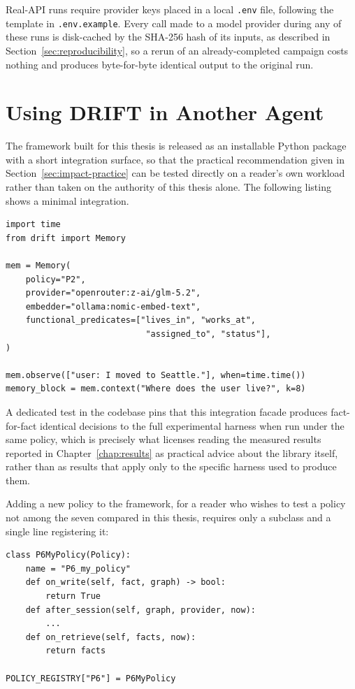 Real-API runs require provider keys placed in a local \texttt{.env} file, following the template in \texttt{.env.example}. Every call made to a model provider during any of these runs is disk-cached by the SHA-256 hash of its inputs, as described in Section~\ref{sec:reproducibility}, so a rerun of an already-completed campaign costs nothing and produces byte-for-byte identical output to the original run.

\section{Using DRIFT in Another Agent}
\label{sec:appendix-integration}

The framework built for this thesis is released as an installable Python package with a short integration surface, so that the practical recommendation given in Section~\ref{sec:impact-practice} can be tested directly on a reader's own workload rather than taken on the authority of this thesis alone. The following listing shows a minimal integration.

\begin{verbatim}
import time
from drift import Memory

mem = Memory(
    policy="P2",
    provider="openrouter:z-ai/glm-5.2",
    embedder="ollama:nomic-embed-text",
    functional_predicates=["lives_in", "works_at",
                            "assigned_to", "status"],
)

mem.observe(["user: I moved to Seattle."], when=time.time())
memory_block = mem.context("Where does the user live?", k=8)
\end{verbatim}

A dedicated test in the codebase pins that this integration facade produces fact-for-fact identical decisions to the full experimental harness when run under the same policy, which is precisely what licenses reading the measured results reported in Chapter~\ref{chap:results} as practical advice about the library itself, rather than as results that apply only to the specific harness used to produce them.

Adding a new policy to the framework, for a reader who wishes to test a policy not among the seven compared in this thesis, requires only a subclass and a single line registering it:

\begin{verbatim}
class P6MyPolicy(Policy):
    name = "P6_my_policy"
    def on_write(self, fact, graph) -> bool:
        return True
    def after_session(self, graph, provider, now):
        ...
    def on_retrieve(self, facts, now):
        return facts

POLICY_REGISTRY["P6"] = P6MyPolicy
\end{verbatim}
